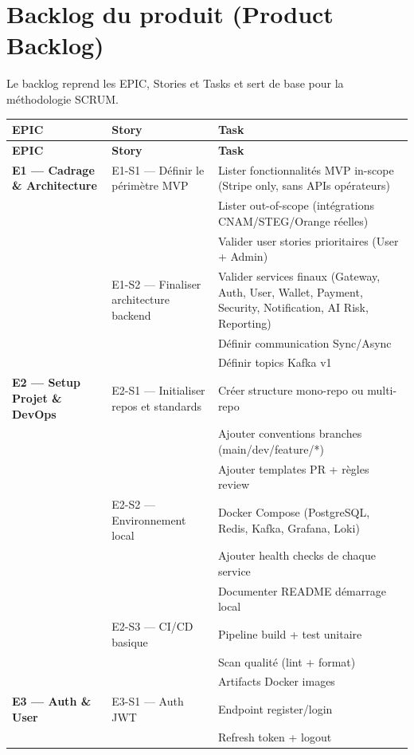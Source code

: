\documentclass[12pt,a4paper]{report}
\begin{document}
\section{Backlog du produit (Product Backlog)}
Le backlog reprend les EPIC, Stories et Tasks et sert de base pour la méthodologie SCRUM.

\begin{longtable}{|p{3.5cm}|p{3.5cm}|p{9cm}|}
\hline
\textbf{EPIC} & \textbf{Story} & \textbf{Task} \\
\hline
\endfirsthead

\hline
\textbf{EPIC} & \textbf{Story} & \textbf{Task} \\
\hline
\endhead

\hline
\endfoot

\textbf{E1 — Cadrage \& Architecture} & E1-S1 — Définir le périmètre MVP & Lister fonctionnalités MVP in-scope (Stripe only, sans APIs opérateurs) \\
& & Lister out-of-scope (intégrations CNAM/STEG/Orange réelles) \\
& & Valider user stories prioritaires (User + Admin) \\
& E1-S2 — Finaliser architecture backend & Valider services finaux (Gateway, Auth, User, Wallet, Payment, Security, Notification, AI Risk, Reporting) \\
& & Définir communication Sync/Async \\
& & Définir topics Kafka v1 \\
\hline
\textbf{E2 — Setup Projet \& DevOps} & E2-S1 — Initialiser repos et standards & Créer structure mono-repo ou multi-repo \\
& & Ajouter conventions branches (main/dev/feature/*) \\
& & Ajouter templates PR + règles review \\
& E2-S2 — Environnement local & Docker Compose (PostgreSQL, Redis, Kafka, Grafana, Loki) \\
& & Ajouter health checks de chaque service \\
& & Documenter README démarrage local \\
& E2-S3 — CI/CD basique & Pipeline build + test unitaire \\
& & Scan qualité (lint + format) \\
& & Artifacts Docker images \\
\hline
\textbf{E3 — Auth \& User} & E3-S1 — Auth JWT & Endpoint register/login \\
& & Refresh token + logout \\

\end{longtable}
\end{document}
